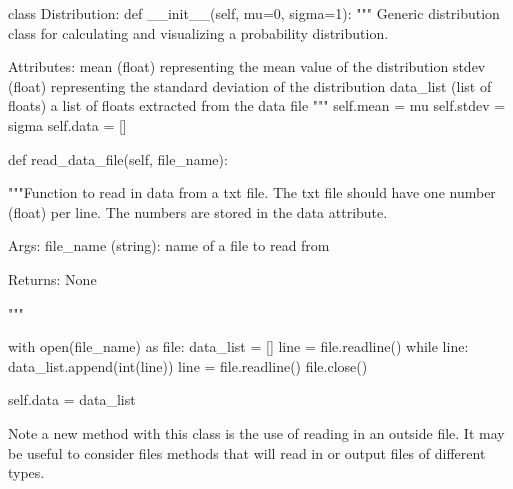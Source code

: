 \begin{python}
	class Distribution:
		def __init__(self, mu=0, sigma=1):
		""" Generic distribution class for calculating and 
		visualizing a probability distribution.
		
			Attributes:
			mean (float) representing the mean value of the distribution
			stdev (float) representing the standard deviation of the distribution
			data_list (list of floats) a list of floats extracted from the data file
			"""
			self.mean = mu
			self.stdev = sigma
			self.data = []
		
		def read_data_file(self, file_name):
		
			"""Function to read in data from a txt file. The txt file should have
			one number (float) per line. The numbers are stored in the data 	attribute.
			
			Args:
			file_name (string): name of a file to read from
			
			Returns:
			None
			
			"""
			
			with open(file_name) as file:
			data_list = []
			line = file.readline()
			while line:
			data_list.append(int(line))
			line = file.readline()
			file.close()
			
			self.data = data_list
\end{python}   

Note a new method with this class is the use of reading in an outside file. It may be useful to consider files methods that will read in or output files of different types.
\\


